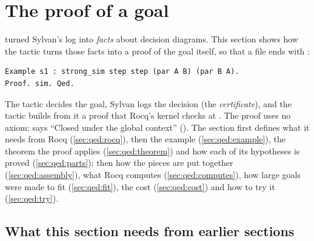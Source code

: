 \section{The proof of a goal}\label{sec:qed}

 turned Sylvan's log into \emph{facts} about decision
diagrams. This section shows how the tactic turns those facts into a
proof of the goal itself, so that a file ends with :
\begin{verbatim}
Example s1 : strong_sim step step (par A B) (par B A).
Proof. sim. Qed.
\end{verbatim}
The tactic decides the goal, Sylvan logs the decision (the
\emph{certificate}), and the tactic builds from it a proof that Rocq's
kernel checks at . The proof uses no axiom:  says ``Closed under the global context''
(). The section first defines what it needs
from Rocq (\cref{sec:qed:rocq}), then the example
(\cref{sec:qed:example}), the theorem the proof applies
(\cref{sec:qed:theorem}) and how each of its hypotheses is proved
(\cref{sec:qed:parts}); then how the pieces are put together
(\cref{sec:qed:assembly}), what Rocq computes (\cref{sec:qed:computes}),
how large goals were made to fit (\cref{sec:qed:fit}), the cost
(\cref{sec:qed:cost}) and how to try it (\cref{sec:qed:try}).

\subsection{What this section needs from earlier sections}\label{sec:qed:terms}

